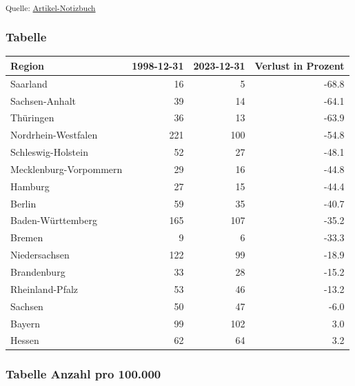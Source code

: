 \documentclass[
  ngerman,
  number,
  preprint,
  3p,
  twocolumn]{elsarticle}
\begin{document}
\textsubscript{Quelle:
\href{https://jakobschumacher.github.io/Update-Facharztmangel-im-oeffentlichen-Gesundheitsdienst/index.qmd.html}{Artikel-Notizbuch}}

\subsubsection{Tabelle}\label{tabelle}

\begin{longtable}[]{@{}lrrr@{}}
\toprule\noalign{}
Region & 1998-12-31 & 2023-12-31 & Verlust in Prozent \\
\midrule\noalign{}
\endhead
\bottomrule\noalign{}
\endlastfoot
Saarland & 16 & 5 & -68.8 \\
Sachsen-Anhalt & 39 & 14 & -64.1 \\
Thüringen & 36 & 13 & -63.9 \\
Nordrhein-Westfalen & 221 & 100 & -54.8 \\
Schleswig-Holstein & 52 & 27 & -48.1 \\
Mecklenburg-Vorpommern & 29 & 16 & -44.8 \\
Hamburg & 27 & 15 & -44.4 \\
Berlin & 59 & 35 & -40.7 \\
Baden-Württemberg & 165 & 107 & -35.2 \\
Bremen & 9 & 6 & -33.3 \\
Niedersachsen & 122 & 99 & -18.9 \\
Brandenburg & 33 & 28 & -15.2 \\
Rheinland-Pfalz & 53 & 46 & -13.2 \\
Sachsen & 50 & 47 & -6.0 \\
Bayern & 99 & 102 & 3.0 \\
Hessen & 62 & 64 & 3.2 \\
\end{longtable}

\subsubsection{Tabelle Anzahl pro
100.000}\label{tabelle-anzahl-pro-100.000}
\end{document}
